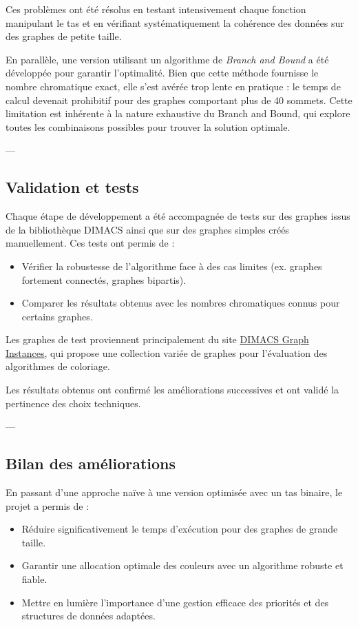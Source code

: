 \documentclass[11pt]{article}
\begin{document}
Ces problèmes ont été résolus en testant intensivement chaque fonction manipulant le tas et en vérifiant systématiquement la cohérence des données sur des graphes de petite taille.

En parallèle, une version utilisant un algorithme de \textit{Branch and Bound} a été développée pour garantir l'optimalité. Bien que cette méthode fournisse le nombre chromatique exact, elle s’est avérée trop lente en pratique : le temps de calcul devenait prohibitif pour des graphes comportant plus de 40 sommets. Cette limitation est inhérente à la nature exhaustive du Branch and Bound, qui explore toutes les combinaisons possibles pour trouver la solution optimale.

---

\subsection{Validation et tests}

Chaque étape de développement a été accompagnée de tests sur des graphes issus de la bibliothèque DIMACS ainsi que sur des graphes simples créés manuellement. Ces tests ont permis de :
\begin{itemize}
    \item Vérifier la robustesse de l’algorithme face à des cas limites (ex. graphes fortement connectés, graphes bipartis).
    \item Comparer les résultats obtenus avec les nombres chromatiques connus pour certains graphes.
\end{itemize}

Les graphes de test proviennent principalement du site \href{https://mat.tepper.cmu.edu/COLOR/instances.html}{DIMACS Graph Instances}, qui propose une collection variée de graphes pour l’évaluation des algorithmes de coloriage.

Les résultats obtenus ont confirmé les améliorations successives et ont validé la pertinence des choix techniques.

---

\subsection{Bilan des améliorations}

En passant d’une approche naïve à une version optimisée avec un tas binaire, le projet a permis de :
\begin{itemize}
    \item Réduire significativement le temps d’exécution pour des graphes de grande taille.
    \item Garantir une allocation optimale des couleurs avec un algorithme robuste et fiable.
    \item Mettre en lumière l’importance d’une gestion efficace des priorités et des structures de données adaptées.
\end{itemize}
\end{document}
